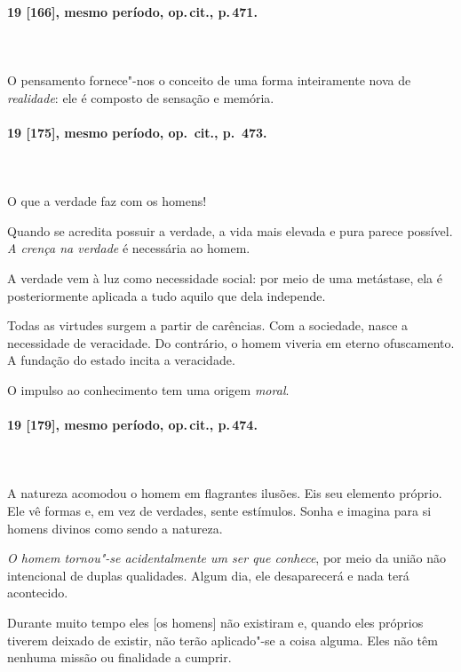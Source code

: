 \pagebreak
\paragraph*{19 [166], mesmo período, op.\,cit., p.\,471.}
\ \\
\ \\

O pensamento fornece"-nos o conceito de uma forma inteiramente nova de
\textit{realidade}: ele é composto de sensação e memória.

\pagebreak
\paragraph*{19 [175], mesmo período, op.\, cit., p.\, 473.}
\ \\
\ \\

O que a verdade faz com os homens!

Quando se acredita possuir a verdade, a vida mais elevada e pura parece
possível. \textit{A crença na verdade} é necessária ao homem.

A verdade vem à luz como necessidade social: por meio de uma metástase,
ela é posteriormente aplicada a tudo aquilo que dela independe.

Todas as virtudes surgem a partir de carências. Com a sociedade, nasce a
necessidade de veracidade. Do contrário, o homem viveria em eterno
ofuscamento. A fundação do estado incita a veracidade. 

O impulso ao conhecimento tem uma origem \textit{moral}.

\pagebreak
\paragraph*{19 [179], mesmo período, op.\,cit., p.\,474.}
\ \\
\ \\ 

A natureza acomodou o homem em flagrantes ilusões. Eis seu elemento
próprio. Ele vê formas e, em vez de verdades, sente estímulos. Sonha e
imagina para si homens divinos como sendo a natureza.

\textit{O homem tornou"-se acidentalmente um ser que conhece}, por meio
da união não intencional de duplas qualidades. Algum dia, ele
desaparecerá e nada terá acontecido.

Durante muito tempo eles [os homens] não existiram e, quando eles
próprios tiverem deixado de existir, não terão aplicado"-se a coisa
alguma. Eles não têm nenhuma missão ou finalidade a cumprir.


